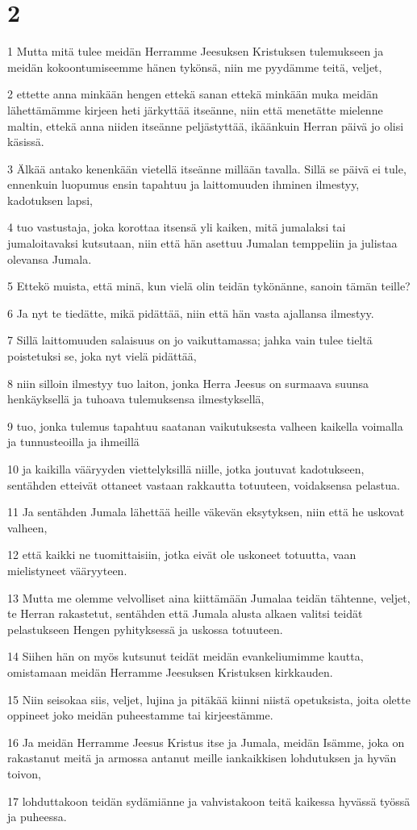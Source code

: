 \chapter{2}

\par 1 Mutta mitä tulee meidän Herramme Jeesuksen Kristuksen tulemukseen ja meidän kokoontumiseemme hänen tykönsä, niin me pyydämme teitä, veljet,
\par 2 ettette anna minkään hengen ettekä sanan ettekä minkään muka meidän lähettämämme kirjeen heti järkyttää itseänne, niin että menetätte mielenne maltin, ettekä anna niiden itseänne peljästyttää, ikäänkuin Herran päivä jo olisi käsissä.
\par 3 Älkää antako kenenkään vietellä itseänne millään tavalla. Sillä se päivä ei tule, ennenkuin luopumus ensin tapahtuu ja laittomuuden ihminen ilmestyy, kadotuksen lapsi,
\par 4 tuo vastustaja, joka korottaa itsensä yli kaiken, mitä jumalaksi tai jumaloitavaksi kutsutaan, niin että hän asettuu Jumalan temppeliin ja julistaa olevansa Jumala.
\par 5 Ettekö muista, että minä, kun vielä olin teidän tykönänne, sanoin tämän teille?
\par 6 Ja nyt te tiedätte, mikä pidättää, niin että hän vasta ajallansa ilmestyy.
\par 7 Sillä laittomuuden salaisuus on jo vaikuttamassa; jahka vain tulee tieltä poistetuksi se, joka nyt vielä pidättää,
\par 8 niin silloin ilmestyy tuo laiton, jonka Herra Jeesus on surmaava suunsa henkäyksellä ja tuhoava tulemuksensa ilmestyksellä,
\par 9 tuo, jonka tulemus tapahtuu saatanan vaikutuksesta valheen kaikella voimalla ja tunnusteoilla ja ihmeillä
\par 10 ja kaikilla vääryyden viettelyksillä niille, jotka joutuvat kadotukseen, sentähden etteivät ottaneet vastaan rakkautta totuuteen, voidaksensa pelastua.
\par 11 Ja sentähden Jumala lähettää heille väkevän eksytyksen, niin että he uskovat valheen,
\par 12 että kaikki ne tuomittaisiin, jotka eivät ole uskoneet totuutta, vaan mielistyneet vääryyteen.
\par 13 Mutta me olemme velvolliset aina kiittämään Jumalaa teidän tähtenne, veljet, te Herran rakastetut, sentähden että Jumala alusta alkaen valitsi teidät pelastukseen Hengen pyhityksessä ja uskossa totuuteen.
\par 14 Siihen hän on myös kutsunut teidät meidän evankeliumimme kautta, omistamaan meidän Herramme Jeesuksen Kristuksen kirkkauden.
\par 15 Niin seisokaa siis, veljet, lujina ja pitäkää kiinni niistä opetuksista, joita olette oppineet joko meidän puheestamme tai kirjeestämme.
\par 16 Ja meidän Herramme Jeesus Kristus itse ja Jumala, meidän Isämme, joka on rakastanut meitä ja armossa antanut meille iankaikkisen lohdutuksen ja hyvän toivon,
\par 17 lohduttakoon teidän sydämiänne ja vahvistakoon teitä kaikessa hyvässä työssä ja puheessa.


